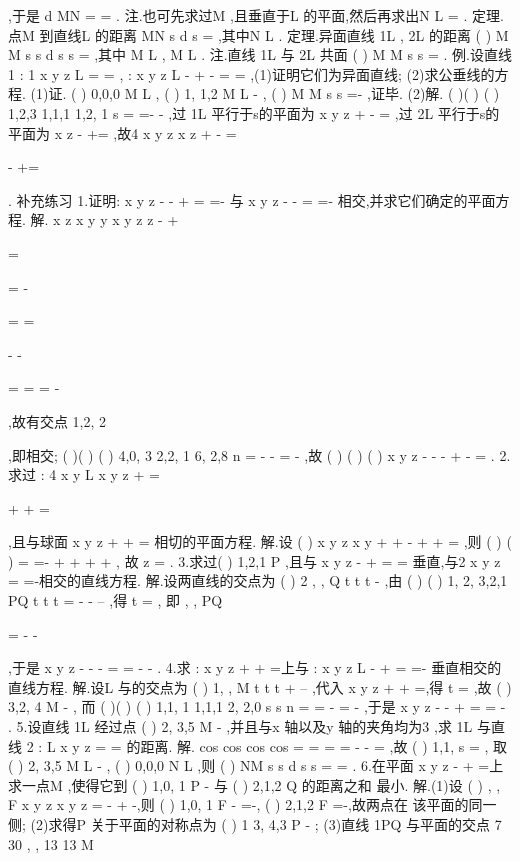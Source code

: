 ,于是
d
MN
=
=
. 
\textcolor{lyred}{注}.也可先求过M ,且垂直于L 的平面\Pi ,然后再求出N
L
=
\cap \Pi . 
\textcolor{lyred}{定理}.点M 到直线L 的距离
MN
s
d
s
\times 
=
\xi \xi \xi \xi \rho 
\rho 
\rho 
,其中N
L
\in 
. 
\textcolor{lyred}{定理}.异面直线
1L ,
2L 的距离
(
)
M M
s
s
d
s
s
\cdots 
\times 
=
\times 
\xi \xi \xi \xi \xi \xi \rho 
\rho 
\rho 
\rho 
\rho 
,其中
M
L
\in 
,
M
L
\in 
. 
\textcolor{lyred}{注}.直线
1L 与
2L 共面
(
)
M M
s
s
\Leftrightarrow 
\cdots 
\times 
=
\xi \xi \xi \xi \xi \xi \rho 
\rho 
\rho 
. 
\textcolor{lyred}{例}.设直线
1 : 1
x
y
z
L
=
=
,
:
x
y
z
L
-
+
-
=
=
,(1)证明它们为异面直线; 
(2)求公垂线的方程. 
(1)证.
(
)
0,0,0
M
L
\in 
,
(
)
1, 1,2
M
L
-
\in 
,
(
)
M M
s
s
\cdots 
\times 
=-\neq 
\xi \xi \xi \xi \xi \xi \rho 
\rho 
\rho 
,证毕. 
(2)解.
(
)(
)
(
)
1,2,3
1,1,1
1,2, 1
s =
\times 
=-
-
\rho 
,过
1L 平行于s\rho 的平面为 
x
y
z
+
-
=
,过
2L 平行于s\rho 的平面为
x
z
-
+=
,故4
x
y
z
x
z
+
-
=

-
+=

. 
\textcolor{lyred}{补充练习 }
1.证明:
x
y
z
-
-
+
=
=-
与
x
y
z
-
-
=
=-
相交,并求它们确定的平面方程. 
解.
x
z
x
y
y
x
y
z
z
-
+


=

=
-


=
\Rightarrow 
=




-
-


=
=
=
-


,故有交点
1,2, 2






,即相交; 
(
)(
)
(
)
4,0, 3
2,2, 1
6, 2,8
n =
-
\times 
-
=
-
\rho 
,故
(
)
(
)
(
)
x
y
z
\cdots 
-
-\cdots 
-
+\cdots 
-
=
. 
2.求过
: 4
x
y
L
x
y
z
+
=


+
+
=

,且与球面
x
y
z
+
+
=
相切的平面方程. 
解.设
(
)
x
y
z
x
y
\lambda 
+
+
-
+
+
=
,则
(
)
(
)
\lambda 
\lambda 
\lambda 
=
\Rightarrow 
=-
+
+
+
+
, 
故
z =
. 
3.求过(
)
1,2,1
P
,且与
x
y
z
-
+
=
=
垂直,与2
x
y
z
=
=-相交的直线方程. 
解.设两直线的交点为
(
)
2 , ,
Q
t t
t
-
,由
(
)
(
)
1,
2,
3,2,1
PQ
t
t
t
=
-
-
--
\bot
\xi \xi \xi \rho 
,得
t =
, 
即
,
,
PQ


=
-
-




\xi \xi \xi \rho 
,于是
x
y
z
-
-
-
=
=
-
-
. 
4.求
:
x
y
z
\Pi 
+
+
=上与
:
x
y
z
L
-
+
=
=-
垂直相交的直线方程. 
解.设L 与\Pi 的交点为
(
)
1, ,
M t
t
t
+
--
,代入
x
y
z
+
+
=,得
t =
,故
(
)
3,2, 4
M
-
, 
而
(
)(
)
(
)
1,1, 1
1,1,1
2, 2,0
s
s
n
=
\times 
=
-
\times 
=
-
\rho 
\rho 
\rho 
,于是
x
y
z
-
-
+
=
=
-
. 
5.设直线
1L 经过点
(
)
2, 3,5
M
-
,并且与x 轴以及y 轴的夹角均为3
\pi ,求
1L 与直线 
2 :
L
x
y
z
=
=
的距离. 
解.
cos
cos
cos
cos
\pi 
\alpha 
\beta 
\gamma 
=
=
=
\Rightarrow 
=
-
-
=
,故
(
)
1,1,
s =
\rho 
, 
取
(
)
2, 3,5
M
L
-
\in 
,
(
)
0,0,0
N
L
\in 
,则
(
)
NM
s
s
d
s
s
\cdots 
\times 
=
=
\times 
\xi \xi \xi \xi \rho 
\rho 
\rho 
\rho 
\rho 
. 
6.在平面
x
y
z
-
+
=上求一点M ,使得它到
(
)
1,0, 1
P
-
与
(
)
2,1,2
Q
的距离之和 
最小. 
解.(1)设
(
)
, ,
F x y z
x
y
z
=
-
+
-,则
(
)
1,0, 1
F
-
=-,
(
)
2,1,2
F
=-,故两点在 
该平面的同一侧; 
(2)求得P 关于平面的对称点为
(
)
1 3, 4,3
P
-
; 
(3)直线
1PQ 与平面的交点
7 30
,
,
13 13
M 


